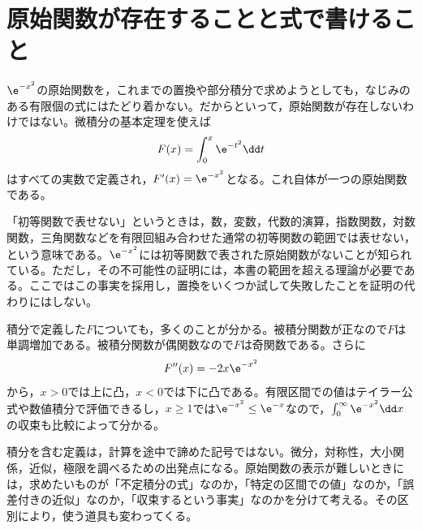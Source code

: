 \section{原始関数が存在することと式で書けること}\label{節:非初等原始関数}

$\e^{-x^2}$の原始関数を，これまでの置換や部分積分で求めようとしても，なじみのある有限個の式にはたどり着かない。だからといって，原始関数が存在しないわけではない。微積分の基本定理を使えば
\[
 F(x)=\int_0^x\e^{-t^2}\dd t
\]
はすべての実数で定義され，$F'(x)=\e^{-x^2}$となる。これ自体が一つの原始関数である。

「初等関数で表せない」というときは，数，変数，代数的演算，指数関数，対数関数，三角関数などを有限回組み合わせた通常の初等関数の範囲では表せない，という意味である。$\e^{-x^2}$には初等関数で表された原始関数がないことが知られている。ただし，その不可能性の証明には，本書の範囲を超える理論が必要である。ここではこの事実を採用し，置換をいくつか試して失敗したことを証明の代わりにはしない。

積分で定義した$F$についても，多くのことが分かる。被積分関数が正なので$F$は単調増加である。被積分関数が偶関数なので$F$は奇関数である。さらに
\[
 F''(x)=-2x\e^{-x^2}
\]
から，$x>0$では上に凸，$x<0$では下に凸である。有限区間での値はテイラー公式や数値積分で評価できるし，$x\geq1$では$\e^{-x^2}\leq\e^{-x}$なので，$\int_0^{\infty}\e^{-x^2}\dd x$の収束も比較によって分かる。

積分を含む定義は，計算を途中で諦めた記号ではない。微分，対称性，大小関係，近似，極限を調べるための出発点になる。原始関数の表示が難しいときには，求めたいものが「不定積分の式」なのか，「特定の区間での値」なのか，「誤差付きの近似」なのか，「収束するという事実」なのかを分けて考える。その区別により，使う道具も変わってくる。

